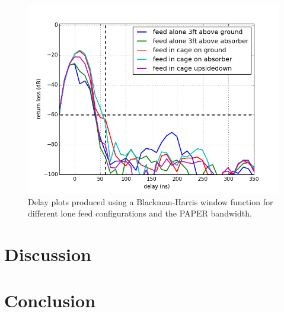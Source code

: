 \documentclass[12pt,preprint]{aastex}
\begin{document}
\begin{figure}
\centering
\includegraphics[totalheight=0.5\textheight]{plots/delay_feed.png}
\caption{Delay plots produced using a Blackman-Harris window function for different lone feed configurations and the PAPER bandwidth.}
\end{figure}


\section{Discussion}

\section{Conclusion}
\end{document}

